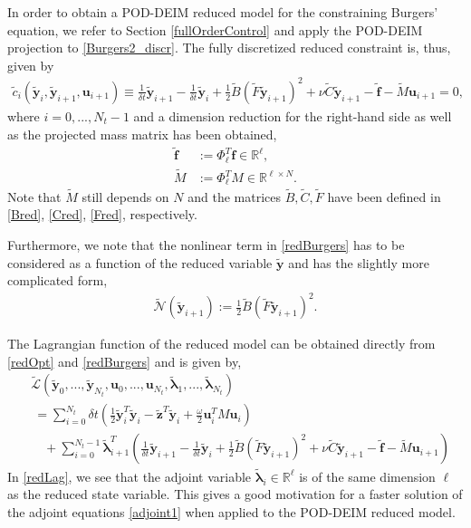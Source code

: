In order to obtain a POD-DEIM reduced model for the constraining Burgers' equation, we refer to Section \ref{fullOrderControl} and apply the POD-DEIM projection to \eqref{Burgers2_discr}. The fully discretized reduced constraint is, thus, given by
\begin{align}
\label{redBurgers}
\tilde{c}_i(\mathbf{\tilde y}_i,\mathbf{\tilde y}_{i+1},\mathbf{u}_{i+1}) \equiv \frac{1}{\delta \! t} \mathbf{\tilde y}_{i+1} - \frac{1}{\delta \! t}\mathbf{\tilde y}_i + \frac{1}{2} \tilde{B}(\tilde{F}\mathbf{\tilde y}_{i+1})^2 + \nu \tilde{C}\mathbf{\tilde y}_{i+1} - \mathbf{\tilde f} - \tilde{M} \mathbf{u}_{i+1} = 0,
\end{align}
where $i=0,...,N_t-1$ and a dimension reduction for the right-hand side as well as the projected mass matrix has been obtained,
\begin{align}
\label{fred}
\mathbf{\tilde f} &:= \Phi_\ell^T \mathbf{f} \in \mathbb{R}^\ell,\\
\label{M1red}
\tilde{M} &:= \Phi_\ell^T M \in \mathbb{R}^{\ell \times N}.
\end{align}
Note that $\tilde{M}$ still depends on $N$ and the matrices $\tilde{B}, \tilde{C}, \tilde{F}$ have been defined in \eqref{Bred}, \eqref{Cred}, \eqref{Fred}, respectively.

Furthermore, we note that the nonlinear term in \eqref{redBurgers} has to be considered as a function of the reduced variable $\mathbf{\tilde y}$ and has the slightly more complicated form,
\begin{align}
 \label{redNonlin}
 \tilde{\mathcal{N}}(\mathbf{\tilde{y}}_{i+1}) := \frac{1}{2} \tilde{B} (\tilde{F} \mathbf{\tilde{y}}_{i+1})^2.
\end{align}

The Lagrangian function of the reduced model can be obtained directly from \eqref{redOpt} and \eqref{redBurgers} and is given by,
\begin{align}
\label{redLag}
&\mathcal{\tilde L}(\mathbf{\tilde y}_0,...,\mathbf{\tilde y}_{N_t}, \mathbf{u}_0,...,\mathbf{u}_{N_t},\boldsymbol{\tilde \lambda}_1,...,\boldsymbol{\tilde \lambda}_{N_t}) \nonumber \\
&\ = \sum_{i=0}^{N_t} \delta \! t \left( \frac{1}{2} \mathbf{\tilde y}_i^T \mathbf{\tilde y}_i - \mathbf{\tilde z}^T\mathbf{\tilde y}_i + \frac{\omega}{2} \mathbf{u}_i^T M \mathbf{u}_i \right) \nonumber \\
&\quad +  \sum_{i=0}^{N_t-1} \boldsymbol{\tilde \lambda}_{i+1}^T \left( \frac{1}{\delta \! t} \mathbf{\tilde y}_{i+1} - \frac{1}{\delta \! t} \mathbf{\tilde y}_i + \frac{1}{2} \tilde{B} (\tilde{F} \mathbf{\tilde y}_{i+1})^2 + \nu \tilde{C} \mathbf{\tilde y}_{i+1} - \mathbf{\tilde f} - \tilde{M} \mathbf{u}_{i+1}  \right)
\end{align}
In \eqref{redLag}, we see that the adjoint variable $\boldsymbol{\tilde \lambda}_i \in \mathbb{R}^\ell$ is of the same dimension $\ell$ as the reduced state variable. This gives a good motivation for a faster solution of the adjoint equations \eqref{adjoint1} when applied to the POD-DEIM reduced model.
